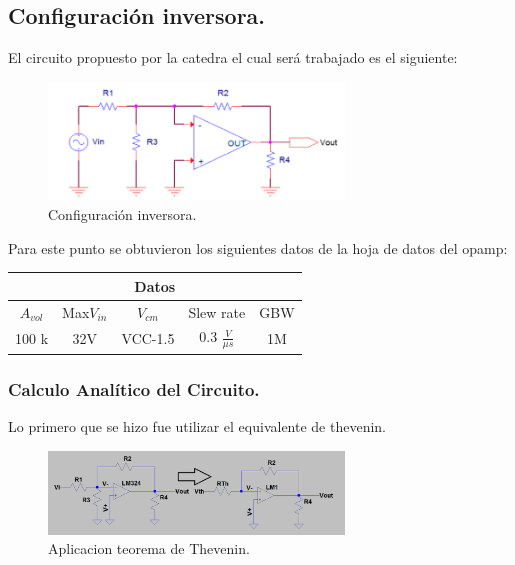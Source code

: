 \subsection{Configuración inversora.}
El circuito propuesto por la catedra el cual será trabajado es el siguiente:

\begin{figure}[htb]	
	\centering
	\includegraphics[width=0.7\textwidth]{Ejercicio1/Imagenes/Circuitoinversor.PNG}
	\caption{Configuración inversora.}
	\label{fig:ConfInv}
\end{figure}
Para este punto se obtuvieron los siguientes datos de la hoja de datos del opamp:
\begin{table}[H]
\begin{center}
\label{tab:datos}
\begin{tabular}{|c|c|c|c|c|}
\hline
\multicolumn{5}{|c|}{\textbf{Datos}}                                      \\ \hline
\textbf{$A_{vol}$} & Max$V_{in}$ & $V_{cm}$ & Slew rate             & GBW \\ \hline
100 k              & 32V         & VCC-1.5  & 0.3 $\frac{V}{\mu s}$ & 1M  \\ \hline
\end{tabular}
\end{center}
\end{table}

\subsubsection{Calculo Analítico del Circuito.}
Lo primero que se hizo fue utilizar el equivalente de thevenin.\\

\begin{figure}[htb]	
	\centering
	\includegraphics[width=0.7\textwidth]{Ejercicio1/Imagenes/Thevenin.PNG}
	\caption{Aplicacion teorema de Thevenin.}
	\label{fig:Thevenin}
\end{figure}

